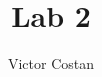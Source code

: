\documentclass{article}
\newcommand{\PsetAuthorName}{Victor Costan}
\newcommand{\PsetTitle}{Lab 2}
\newcommand{\PsetMainFile}{6.823/lab2/all.tex}
\begin{document}
\title{\PsetClassNumber\space\PsetClassTerm\space\PsetTitle}
\author{\PsetAuthorName}
\maketitle


\end{document}
